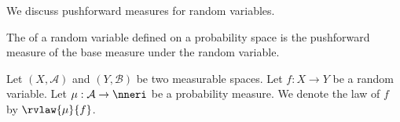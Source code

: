 
\sbasic



\sstart



We discuss pushforward
measures for random
variables.


The
of a random variable
defined on a probability space
is the pushforward measure
of the base measure
under the random variable.


Let
$(X, \mathcal{A})$
and
$(Y, \mathcal{B})$
be two measurable spaces.
Let $f: X \to Y$ be
a random variable.
Let
$\mu: \mathcal{A} \to \nneri$
be a probability measure.
We denote the
law of $f$
by $\rvlaw{\mu}{f}$.

\strats
